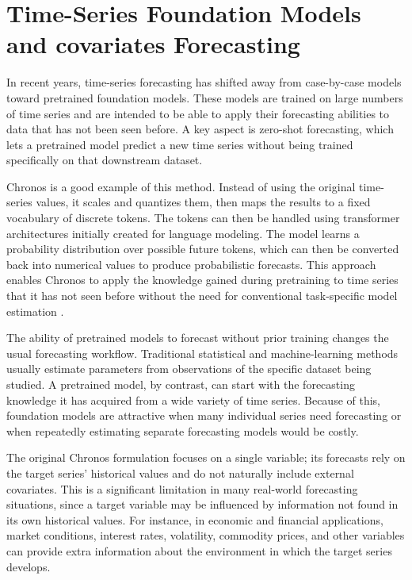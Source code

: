 \documentclass[12pt,a4paper,twoside,openany]{book}
\begin{document}
\section{Time-Series Foundation
Models and covariates Forecasting}\label{time-series-foundation-models and covariates forecasting}

In recent years, time-series forecasting has shifted away from case-by-case models toward pretrained foundation models. These models are trained on large numbers of time series and are intended to be able to apply their forecasting abilities to data that has not been seen before. A key aspect is zero-shot forecasting, which lets a pretrained model predict a new time series without being trained specifically on that downstream dataset.

Chronos is a good example of this method. Instead of using the original time-series values, it scales and quantizes them, then maps the results to a fixed vocabulary of discrete tokens. The tokens can then be handled using transformer architectures initially created for language modeling. The model learns a probability distribution over possible future tokens, which can then be converted back into numerical values to produce probabilistic forecasts. This approach enables Chronos to apply the knowledge gained during pretraining to time series that it has not seen before without the need for conventional task-specific model estimation \cite{ansari2025chronos2}.



The ability of pretrained models to forecast without prior training changes the usual forecasting workflow. Traditional statistical and machine-learning methods usually estimate parameters from observations of the specific dataset being studied. A pretrained model, by contrast, can start with the forecasting knowledge it has acquired from a wide variety of time series. Because of this, foundation models are attractive when many individual series need forecasting or when repeatedly estimating separate forecasting models would be costly.

The original Chronos formulation focuses on a single variable; its forecasts rely on the target series' historical values and do not naturally include external covariates. This is a significant limitation in many real-world forecasting situations, since a target variable may be influenced by information not found in its own historical values. For instance, in economic and financial applications, market conditions, interest rates, volatility, commodity prices, and other variables can provide extra information about the environment in which the target series develops.
\end{document}
